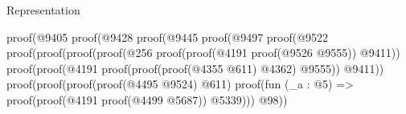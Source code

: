 \begin{lexlean}{Representation}
\begin{coremodule}
                                                                proof(@9405
                                                                    proof(@9428
                                                                        proof(@9445
                                                                            proof(@9497
                                                                                proof(@9522
                                                                                    proof(proof(proof(proof(@256
                                                                                              proof(proof(@4191
                                                                                                    proof(@9526
                                                                                                        @9555))
                                                                                                  @9411))
                                                                                            proof(proof(@4191
                                                                                                  proof(proof(proof(@4355
                                                                                                          @611)
                                                                                                        @4362)
                                                                                                      @9555))
                                                                                                @9411))
                                                                                          proof(proof(proof(proof(@4495
                                                                                                    @9524)
                                                                                                  @611)
                                                                                                proof(fun (_a : @5) =>
                                                                                                  proof(proof(@4191
                                                                                                        proof(@4499
                                                                                                            @5687))
                                                                                                      @5339)))
                                                                                              @98))

\end{coremodule}
\end{lexlean}

